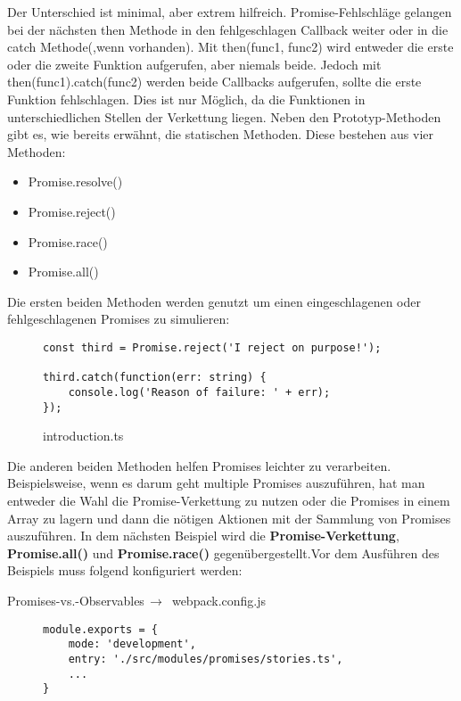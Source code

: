 \noindent
Der Unterschied ist minimal, aber extrem hilfreich. Promise-Fehlschläge gelangen bei der nächsten then Methode in den fehlgeschlagen Callback weiter oder in die catch Methode(,wenn vorhanden). Mit then(func1, func2) wird entweder die erste oder die zweite Funktion aufgerufen, aber niemals beide. Jedoch mit then(func1).catch(func2) werden beide Callbacks aufgerufen, sollte die erste Funktion fehlschlagen. Dies ist nur Möglich, da die Funktionen in unterschiedlichen Stellen der Verkettung liegen. Neben den Prototyp-Methoden gibt es, wie bereits erwähnt, die statischen Methoden. Diese bestehen aus vier Methoden:

\begin{itemize}
\item Promise.resolve()
\item Promise.reject()
\item Promise.race()
\item Promise.all()
\end{itemize}

\noindent
Die ersten beiden Methoden werden genutzt um einen eingeschlagenen oder fehlgeschlagenen Promises zu simulieren:

\begin{figure}[H]
\begin{lstlisting}
const third = Promise.reject('I reject on purpose!');

third.catch(function(err: string) {
    console.log('Reason of failure: ' + err);
});
\end{lstlisting}
\caption{introduction.ts}
\end{figure}

\noindent
Die anderen beiden Methoden helfen Promises leichter zu verarbeiten. Beispielsweise, wenn es darum geht multiple Promises auszuführen, hat man entweder die Wahl die Promise-Verkettung zu nutzen oder die Promises in einem Array zu lagern und dann die nötigen Aktionen mit der Sammlung von Promises auszuführen. In dem nächsten Beispiel wird die \textbf{Promise-Verkettung}, \textbf{Promise.all()} und \textbf{Promise.race()} gegenübergestellt.Vor dem Ausführen des Beispiels muss folgend konfiguriert werden:

 \begin{center}
     Promises-vs.-Observables$\,\to\,$ webpack.config.js
 \end{center}

\begin{figure}[H]
\begin{lstlisting}
module.exports = {
    mode: 'development',
    entry: './src/modules/promises/stories.ts',
    ...
}
\end{lstlisting}
\end{figure}


